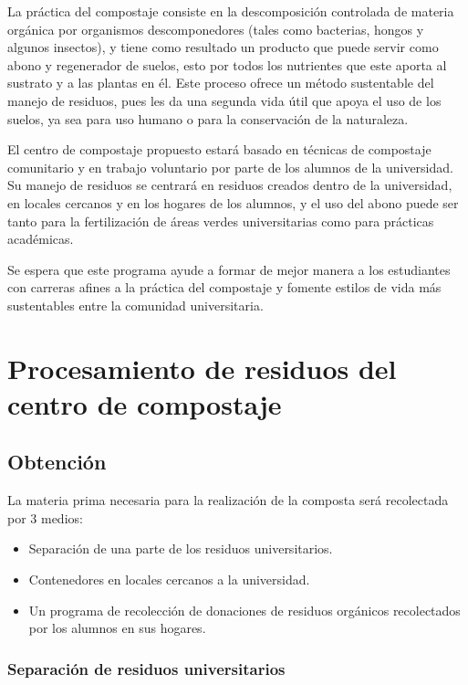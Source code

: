 
La práctica del compostaje consiste en la descomposición controlada de materia orgánica por organismos descomponedores (tales como bacterias, hongos y algunos insectos), y tiene como resultado un producto que puede servir como abono y regenerador de suelos, esto por todos los nutrientes que este aporta al sustrato y a las plantas en él. Este proceso ofrece un método sustentable del manejo de residuos, pues les da una segunda vida útil que apoya el uso de los suelos, ya sea para uso humano o para la conservación de la naturaleza.

El centro de compostaje propuesto estará basado en técnicas de compostaje comunitario y en trabajo voluntario por parte de los alumnos de la universidad. Su manejo de residuos se centrará en residuos creados dentro de la universidad, en locales cercanos y en los hogares de los alumnos, y el uso del abono puede ser tanto para la fertilización de áreas verdes universitarias como para prácticas académicas.

Se espera que este programa ayude a formar de mejor manera a los estudiantes con carreras afines a la práctica del compostaje y fomente estilos de vida más sustentables entre la comunidad universitaria.

\section{Procesamiento de residuos del centro de compostaje}

\subsection{Obtención}

La materia prima necesaria para la realización de la composta será recolectada por 3 medios:

\begin{itemize}
    \item Separación de una parte de los residuos universitarios.
    \item Contenedores en locales cercanos a la universidad.
    \item Un programa de recolección de donaciones de residuos orgánicos recolectados por los alumnos en sus hogares.
\end{itemize}

\subsubsection{Separación de residuos universitarios}


